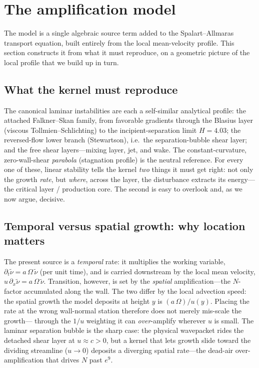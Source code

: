 \section{The amplification model}\label{sec:model}

The model is a single algebraic source term added to the Spalart--Allmaras
transport equation, built entirely from the local mean-velocity profile. This
section constructs it from what it must reproduce, on a geometric picture of
the local profile that we build up in turn.

\subsection{What the kernel must reproduce}\label{sec:reproduce}
The canonical laminar instabilities are each a self-similar analytical
profile: the attached Falkner--Skan family, from favorable gradients through
the Blasius layer (viscous Tollmien--Schlichting) to the incipient-separation
limit $H\!=\!4.03$; the reversed-flow lower branch (Stewartson), i.e.\ the
separation-bubble shear layer; and the free shear layers---mixing layer, jet,
and wake. The constant-curvature, zero-wall-shear \emph{parabola}
(stagnation profile) is the neutral reference. For every one of these, linear
stability tells the kernel \emph{two} things it must get right: not only the
growth \emph{rate}, but \emph{where}, across the layer, the disturbance
extracts its energy---the critical layer / production core. The second is
easy to overlook and, as we now argue, decisive.

\subsection{Temporal versus spatial growth: why location matters}\label{sec:tempspatial}
The present source is a \emph{temporal} rate: it multiplies the working
variable, $\partial_t\tilde\nu = a\,\Omega\,\tilde\nu$ (per unit time), and is
carried downstream by the local mean velocity,
$u\,\partial_x\tilde\nu = a\,\Omega\,\tilde\nu$. Transition, however, is set by
the \emph{spatial} amplification---the $N$-factor accumulated along the
wall. The two differ by the local advection speed: the spatial growth the
model deposits at height $y$ is $(a\,\Omega)/u(y)$. Placing the rate at the
wrong wall-normal station therefore does not merely mis-scale the growth---%
through the $1/u$ weighting it can \emph{over}-amplify wherever $u$ is small.
The laminar separation bubble is the sharp case: the physical wavepacket rides
the detached shear layer at $u\!\approx\!c\!>\!0$, but a kernel that lets
growth slide toward the dividing streamline ($u\!\to\!0$) deposits a diverging
spatial rate---the dead-air over-amplification that drives $N$ past $e^{9}$.

